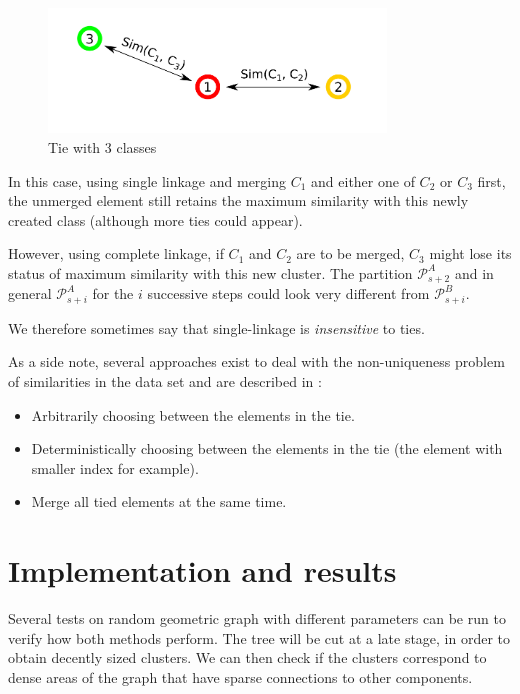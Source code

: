 \documentclass[12pt,a4paper]{article}
\begin{document}
\begin{figure}[ht!]
  \centering
  \includegraphics[width=0.8\textwidth]{img/real-tie.png}
  \caption{Tie with 3 classes}
  \label{fig:real-tie}
\end{figure}

In this case, using single linkage and merging $C_1$ and either one of
$C_2$ or $C_3$ first, the unmerged element still retains the maximum
similarity with this newly created class (although more ties could
appear).

However, using complete linkage, if $C_1$ and $C_2$ are to be merged,
$C_3$ might lose its status of maximum similarity with this new
cluster. The partition $\mathcal{P}_{s+2}^A$ and in general
$\mathcal{P}_{s+i}^{A}$ for the $i$ successive steps could look very
different from $\mathcal{P}_{s+i}^B$.

We therefore sometimes say that single-linkage is \emph{insensitive}
to ties.

As a side note, several approaches exist to deal with the
non-uniqueness problem of similarities in the data set and are
described in \cite{nonunique}:

\begin{itemize}
\item Arbitrarily choosing between the elements in the tie.
\item Deterministically choosing between the elements in the tie
  (the element with smaller index for example).
\item Merge all tied elements at the same time.
\end{itemize}


\section{Implementation and results}

Several tests on random geometric graph with different parameters can
be run to verify how both methods perform. The tree will be cut at a
late stage, in order to obtain decently sized clusters. We can then
check if the clusters correspond to dense areas of the graph that have
sparse connections to other components.
\end{document}
